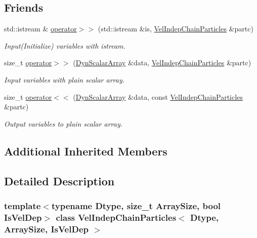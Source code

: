 \subsection*{Friends}
\begin{DoxyCompactItemize}
\item 
std\+::istream \& \mbox{\hyperlink{class_vel_indep_chain_particles_a87208692311239cfefd6d58ea4ce39ce}{operator$>$$>$}} (std\+::istream \&is, \mbox{\hyperlink{class_vel_indep_chain_particles}{Vel\+Indep\+Chain\+Particles}} \&partc)
\begin{DoxyCompactList}\small\item\em Input(\+Initialize) variables with istream. \end{DoxyCompactList}\item 
size\+\_\+t \mbox{\hyperlink{class_vel_indep_chain_particles_a14ddc76e4a83ec2a17c39487668ea348}{operator$>$$>$}} (\mbox{\hyperlink{class_vel_indep_particles_a6bba8ac3f941a144214037a27ccaa119}{Dyn\+Scalar\+Array}} \&data, \mbox{\hyperlink{class_vel_indep_chain_particles}{Vel\+Indep\+Chain\+Particles}} \&partc)
\begin{DoxyCompactList}\small\item\em Input variables with plain scalar array. \end{DoxyCompactList}\item 
size\+\_\+t \mbox{\hyperlink{class_vel_indep_chain_particles_a2bd1a832e8f46ef461776d62d90965c4}{operator$<$$<$}} (\mbox{\hyperlink{class_vel_indep_particles_a6bba8ac3f941a144214037a27ccaa119}{Dyn\+Scalar\+Array}} \&data, const \mbox{\hyperlink{class_vel_indep_chain_particles}{Vel\+Indep\+Chain\+Particles}} \&partc)
\begin{DoxyCompactList}\small\item\em Output variables to plain scalar array. \end{DoxyCompactList}\end{DoxyCompactItemize}
\subsection*{Additional Inherited Members}


\subsection{Detailed Description}
\subsubsection*{template$<$typename Dtype, size\+\_\+t Array\+Size, bool Is\+Vel\+Dep$>$\newline
class Vel\+Indep\+Chain\+Particles$<$ Dtype, Array\+Size, Is\+Vel\+Dep $>$}

